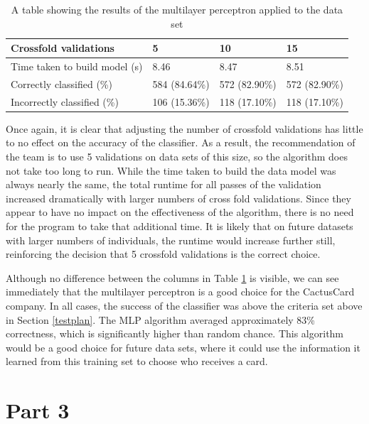 \documentclass[11pt,journal]{IEEEtran}
\begin{document}
\begin{table}[H]
{\renewcommand{\arraystretch}{1.2}%
	\begin{tabular}{ | p{2.5cm} | l | l | l | }
\hline
Crossfold validations         & 5             & 10            & 15            \\ \hline
Time taken to build model (s) & 8.46          & 8.47          & 8.51          \\ \hline
Correctly classified (\%)     & 584 (84.64\%) & 572 (82.90\%) & 572 (82.90\%) \\ \hline
Incorrectly classified (\%)   & 106 (15.36\%) & 118 (17.10\%) &           118 (17.10\%)  \\ \hline
\end{tabular}
} \quad
\caption{A table showing the results of the multilayer perceptron applied to the data set}
\label{fig:mlp}
\end{table}

Once again, it is clear that adjusting the number of crossfold validations has little to no effect on the accuracy of the classifier. As a result, the recommendation of the team is to use 5 validations on data sets of this size, so the algorithm does not take too long to run. While the time taken to build the data model was always nearly the same, the total runtime for all passes of the validation increased dramatically with larger numbers of cross fold validations. Since they appear to have no impact on the effectiveness of the algorithm, there is no need for the program to take that additional time. It is likely that on future datasets with larger numbers of individuals, the runtime would increase further still, reinforcing the decision that 5 crossfold validations is the correct choice.
\par
Although no difference between the columns in Table \ref{fig:mlp} is visible, we can see immediately that the multilayer perceptron is a good choice for the CactusCard company. In all cases, the success of the classifier was above the criteria set above in Section \ref{testplan}. The MLP algorithm averaged approximately 83\% correctness, which is significantly higher than random chance. This algorithm would be a good choice for future data sets, where it could use the information it learned from this training set to choose who receives a card.

\section{Part 3} \label{part3}
\end{document}
